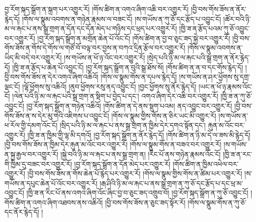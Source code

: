 བྱ་རོག་སྐད་སྒྲོག་ན་སྐྲག་པར་འགྱུར་རོ། །གོས་ཚིག་ན་འགའ་ཞིག་འཆི་བར་འགྱུར་རོ། །བྱི་བས་གོས་ཟོས་ན་ནོར་རྙེད་དོ། །གོས་ལ་སྣུམ་འབགས་ན་གཉེན་རྣམས་ལ་བཟང་ངོ། །ས་གཡོས་ན་ཀུ་ཅོ་དང་རྩོད་པ་འབྱུང་ངོ། །ཚོར་བའི་ཉི་མ་ལ་རྐང་པ་ནས་སྒྲ་གྲག་ན་དོན་དང་དོན་མེད་པ་གཉིས་དང་ཕྲད་པར་འགྱུར་རོ། །ཁྱི་ཟ་ན་རྩོད་པའམ་ཀུ་ཅོ་འབྱུང་བར་འགྱུར་རོ། །བྱ་རོག་སྐད་སྒྲོག་ན་མགྲོན་ཆེན་པོ་འོང་ངོ། །གོས་ཚིག་ན་བྱ་བ་ཅུང་ཟད་སྐྱེ་བར་འགྱུར་རོ། །བྱི་བས་གོས་ཟོས་ན་གོས་དེ་གོས་ལ་གཙོ་བོ་བལྟ་བར་བྱས་ན་བཀའ་དྲིན་རྩོལ་བར་འགྱུར་རོ། །གོས་ལ་སྣུམ་འབགས་ན་ཡིད་མི་བདེ་བར་འགྱུར་རོ། །ས་གཡོས་ན་ཕོ་ཉ་འོང་བར་འགྱུར་རོ། །སྲེད་པའི་ཉི་མ་ལ་རྐང་པའི་སྒྲ་གྲག་ན་ནོར་རྙེད་དོ། །ཁྱི་ཟ་ན་རྩོད་པ་ཆེན་པོ་འབྱུང་ངོ། །བྱ་རོག་སྐད་སྒྲོག་ན་བུའི་སྒྲ་ཐོས་སོ། །གོས་ཚིག་ན་ན་བ་དང་གོས་རྙེད་དོ། །བྱི་བས་གོས་ཟོས་ན་དེར་འགའ་ཞིག་འཆིའོ། །གོས་ལ་སྣུམ་གོས་ན་དཔལ་རྙེད་དོ། །ས་གཡོས་ན་ཤར་ཕྱོགས་སུ་དགྲ་ལྡང་ངོ། །ལྷོ་ཕྱོགས་སུ་འཆིའོ། །ནུབ་ཕྱོགས་རསུ་ནད་འབྱུང་ངོ། །བྱང་ཕྱོགས་སུ་ནོར་རྙེད་དོ། །ཡང་ན་ཕོ་ཉ་རྣམས་འོང་ངོ། །ལེན་པའི་ཉི་མ་ལ་རྐང་པའི་སྒྲ་གྲག་ན་སྡིག་པ་བྱེད་པ་དང་། འགའ་ཞིག་དེར་འཆི་བར་འགྱུར་རོ། །ཁྱི་ཟ་ན་ཀུ་ཅོ་འབྱུང་ངོ། །བྱ་རོག་སྐད་སྒྲོག་ན་གཉེན་འཆིའོ། །གོས་ཚིག་ན་དེ་ནས་སྡུག་པའམ། ནད་འབྱུང་བར་འགྱུར་རོ། །བྱི་བས་གོས་ཟོས་ན་ས་དེར་མུ་གེའི་འཇིགས་པ་འབྱུང་ངོ། །གོས་ལ་སྣུམ་གྱིས་གོས་ན་ཅིར་ཡང་མི་འགྱུར་རོ། །ས་གཡོས་ན་ཕ་རོལ་གྱི་དམག་འོང་ངོ། །སྲིད་པའི་ཉི་མ་ལ་རྐང་པ་ནས་སྒྲ་གྲག་ན་ཁྱིམ་དེར་དགའ་སྟོན་དང་། རྐུན་མ་འོང་བར་འགྱུར་རོ། །ཁྱི་ཟ་ན་ཁྱིམ་གྱི་ལྷ་མི་དགའོ། །བྱ་རོག་སྐད་སྒྲོག་ན་ནོར་རྙེད་དོ། །གོས་ཚིག་ན་ཉི་མ་དེ་ལ་ཟས་མི་རྙེད་དོ། །བྱི་བས་གོས་ཟོས་ན་ཁྱིམ་དེར་རྐུན་མ་འོང་བར་འགྱུར་རོ། །གོས་ལ་སྣུམ་གོས་ན་བཟའ་བར་འགྱུར་རོ། །ས་གཡོས་ན་སྐྱ་རྒྱལ་བར་འགྱུར་རོ། །སྐྱེ་བའི་ཉི་མ་ལ་རྐང་པ་ནས་སྒྲ་གྲག་ན། །རིང་པོ་ནས་གཉེན་རྣམས་འོང་ངོ། །ཁྱི་ཟ་ན་རང་གི་ཁྱིམ་དུ་བཟང་བར་འགྱུར་རོ། །བྱ་རོག་སྐད་སྒྲོག་ན་དོན་མེད་པར་འགྱུར་རོ། །གོས་ཚིག་ན་ཁྱིམ་འཕེལ་བར་འགྱུར་རོ། །བྱི་བས་གོས་ཟོས་ན་གོས་ཆེན་པོ་རྙེད་པར་འགྱུར་རོ། །གོས་ལ་སྣུམ་གྱིས་གོས་ན་ཚིམ་པར་འགྱུར་རོ། །ས་གཡོས་ན་དཔུང་ཆེན་པོ་འོང་བར་འགྱུར་རོ། །རྒ་ཤིའི་ཉི་མ་ལ་རྐང་པ་ནས་སྒྲ་གྲག་ན་ཀུ་ཅོ་དང་རྩོད་པ་དང་ཕྲ་མ་འབྱུང་ངོ། །ཁྱི་ཟ་ན་རིང་པོ་ནས་འགའ་ཞིག་འོང་ཞིང་བྱ་བ་ཅུང་ཟད་འགྲུབ་བོ། །བྱ་རོག་སྐད་སྒྲོག་ན་ཀུ་ཅོ་འབྱུང་ངོ། །གོས་ཚིག་ན་འགའ་ཞིག་འཐབས་ནས་འཆིའོ། །བྱི་བས་གོས་ཟོས་ན་ཅུང་ཟད་སྟོར་རོ། །གོས་ལ་སྣུམ་གོས་ན་ཀུ་ཅོ་དང་ནོར་རྙེད་དོ། །
